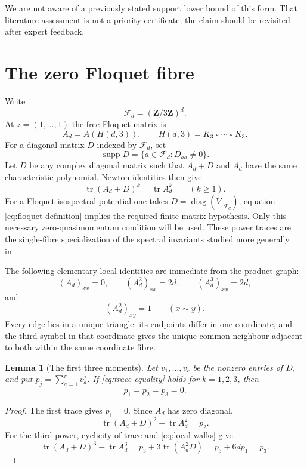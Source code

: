 \documentclass[11pt,reqno]{amsart}
\newtheorem{lemma}[theorem]{Lemma}
\theoremstyle{definition}
\theoremstyle{remark}
\DeclareMathOperator{\supp}{supp}
\DeclareMathOperator{\tr}{tr}
\newcommand{\Z}{\mathbf Z}
\begin{document}
We are not aware of a previously stated support lower bound of this form.
That literature assessment is not a priority certificate; the claim should
be revisited after expert feedback.

\section{The zero Floquet fibre}

Write
\[
 \mathcal F_d=(\Z/3\Z)^d.
\]
At $z=(1,\ldots,1)$ the free Floquet matrix is
\[
 A_d=A(H(d,3)),
 \qquad H(d,3)=K_3\mathbin{\square}\cdots\mathbin{\square}K_3.
\]
For a diagonal matrix $D$ indexed by $\mathcal F_d$, set
\[
 \supp D=\{a\in\mathcal F_d:D_{aa}\neq0\}.
\]
Let $D$ be any complex diagonal matrix such that $A_d+D$ and $A_d$ have
the same characteristic polynomial.  Newton identities then give
\begin{equation}\label{eq:trace-equality}
 \tr(A_d+D)^k=\tr A_d^k\qquad(k\geq1).
\end{equation}
For a Floquet-isospectral potential one takes
$D=\operatorname{diag}(V|_{\mathcal F_d})$; equation
\eqref{eq:floquet-definition} implies the required finite-matrix hypothesis.
Only this necessary zero-quasimomentum condition will be used.
These power traces are the single-fibre specialization of the spectral
invariants studied more generally in~\cite{saburova2026}.

The following elementary local identities are immediate from the product
graph:
\begin{equation}\label{eq:local-walks}
 (A_d)_{xx}=0,\qquad
 (A_d^2)_{xx}=2d,\qquad
 (A_d^3)_{xx}=2d,
\end{equation}
and
\begin{equation}\label{eq:common-neighbour}
 (A_d^2)_{xy}=1\qquad(x\sim y).
\end{equation}
Every edge lies in a unique triangle: its endpoints differ in one coordinate,
and the third symbol in that coordinate gives the unique common neighbour
adjacent to both within the same coordinate fibre.

\begin{lemma}[The first three moments]\label{lem:first-three}
Let $v_1,\ldots,v_r$ be the nonzero entries of $D$, and put
$p_j=\sum_{a=1}^r v_a^j$.  If \eqref{eq:trace-equality} holds for
$k=1,2,3$, then
\[
 p_1=p_2=p_3=0.
\]
\end{lemma}

\begin{proof}
The first trace gives $p_1=0$.  Since $A_d$ has zero diagonal,
\[
 \tr(A_d+D)^2-\tr A_d^2=p_2.
\]
For the third power, cyclicity of trace and \eqref{eq:local-walks} give
\[
 \tr(A_d+D)^3-\tr A_d^3
 =p_3+3\tr(A_d^2D)=p_3+6dp_1=p_3.
\]
\end{proof}
\end{document}

